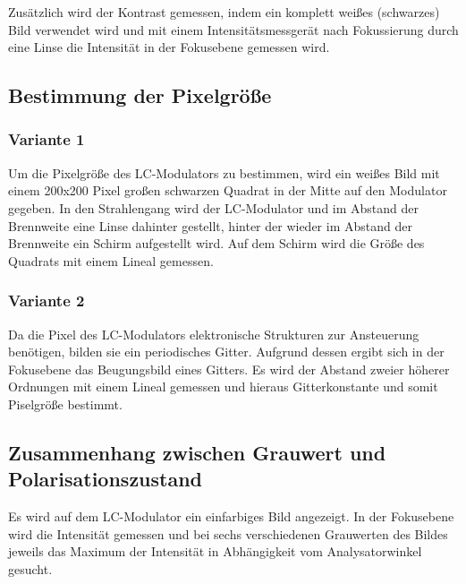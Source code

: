 \documentclass[
	a4paper,
	12pt,
	pagesize,
	ngerman
]{scrartcl}
\begin{document}
	Zusätzlich wird der Kontrast gemessen, indem ein komplett weißes (schwarzes) Bild verwendet wird und mit einem Intensitätsmessgerät nach Fokussierung durch eine Linse die Intensität in der Fokusebene gemessen wird.

	\subsection{Bestimmung der Pixelgröße}
		\subsubsection*{Variante 1}
		Um die Pixelgröße des LC-Modulators zu bestimmen, wird ein weißes Bild mit einem 200x200 Pixel großen schwarzen Quadrat in der Mitte auf den Modulator gegeben.
		In den Strahlengang wird der LC-Modulator und im Abstand der Brennweite eine Linse dahinter gestellt, hinter der wieder im Abstand der Brennweite ein Schirm aufgestellt wird.
		Auf dem Schirm wird die Größe des Quadrats mit einem Lineal gemessen. %
		\subsubsection*{Variante 2}
		Da die Pixel des LC-Modulators elektronische Strukturen zur Ansteuerung benötigen, bilden sie ein periodisches Gitter. %
		Aufgrund dessen ergibt sich in der Fokusebene das Beugungsbild eines Gitters.
		Es wird der Abstand zweier höherer Ordnungen mit einem Lineal gemessen und hieraus Gitterkonstante und somit Piselgröße bestimmt.


	\subsection{Zusammenhang zwischen Grauwert und Polarisationszustand}

		Es wird auf dem LC-Modulator ein einfarbiges Bild angezeigt. %
		In der Fokusebene wird die Intensität gemessen und bei sechs verschiedenen Grauwerten des Bildes jeweils das Maximum der Intensität in Abhängigkeit vom Analysatorwinkel gesucht. %
\end{document}

